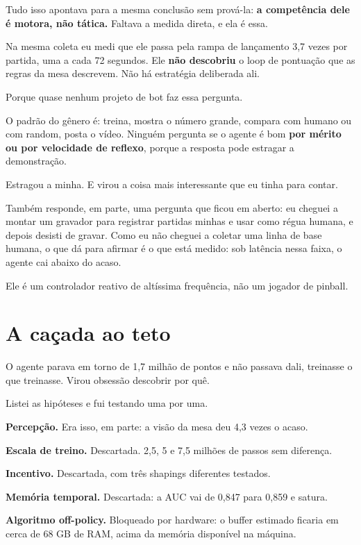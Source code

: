 \documentclass[10pt,a4paper,twoside,twocolumn]{scrartcl}
\begin{document}
Tudo isso apontava para a mesma conclusão sem prová-la: \textbf{a
competência dele é motora, não tática.} Faltava a medida direta, e ela é
essa.

Na mesma coleta eu medi que ele passa pela rampa de lançamento 3,7 vezes
por partida, uma a cada 72 segundos. Ele \textbf{não descobriu} o loop
de pontuação que as regras da mesa descrevem. Não há estratégia
deliberada ali.

Porque quase nenhum projeto de bot faz essa pergunta.

O padrão do gênero é: treina, mostra o número grande, compara com humano
ou com random, posta o vídeo. Ninguém pergunta se o agente é bom
\textbf{por mérito ou por velocidade de reflexo}, porque a resposta pode
estragar a demonstração.

Estragou a minha. E virou a coisa mais interessante que eu tinha para
contar.

Também responde, em parte, uma pergunta que ficou em aberto: eu cheguei
a montar um gravador para registrar partidas minhas e usar como régua
humana, e depois desisti de gravar. Como eu não cheguei a coletar uma
linha de base humana, o que dá para afirmar é o que está medido: sob
latência nessa faixa, o agente cai abaixo do acaso.

Ele é um controlador reativo de altíssima frequência, não um jogador de
pinball.

\section{A caçada ao teto}\label{a-cauxe7ada-ao-teto}

O agente parava em torno de 1,7 milhão de pontos e não passava dali,
treinasse o que treinasse. Virou obsessão descobrir por quê.

Listei as hipóteses e fui testando uma por uma.

\textbf{Percepção.} Era isso, em parte: a visão da mesa deu 4,3 vezes o
acaso.

\textbf{Escala de treino.} Descartada. 2,5, 5 e 7,5 milhões de passos
sem diferença.

\textbf{Incentivo.} Descartada, com três shapings diferentes testados.

\textbf{Memória temporal.} Descartada: a AUC vai de 0,847 para 0,859 e
satura.

\textbf{Algoritmo off-policy.} Bloqueado por hardware: o buffer estimado
ficaria em cerca de 68 GB de RAM, acima da memória disponível na
máquina.
\end{document}
